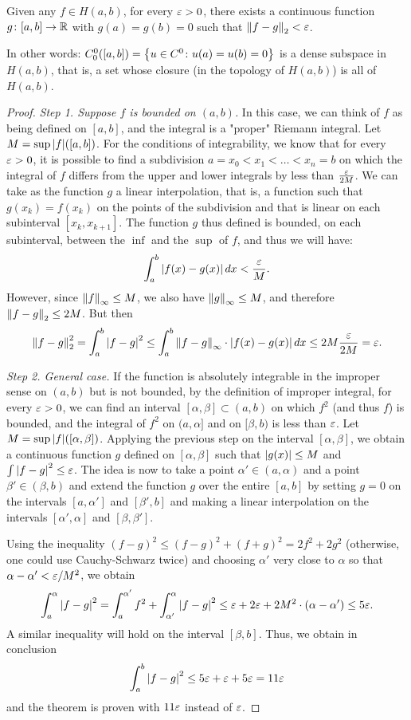 \begin{theorem}
Given any $f\in H(a, b)$, for every $\varepsilon>0$, there exists a continuous function
$g\colon [a,b]\to {\mathbb R}$ with $g(a)=g(b)=0$ such that ${\left\Vert f-g\right\Vert}_2<\varepsilon$.

In other words: $C^0_0([a,b])={\left\{ u\in C^0\colon u(a)=u(b)=0 \right\}}$ is a dense
subspace in $H(a,b)$, that is, a set whose closure (in the topology of $H(a,b)$)
is all of $H(a,b)$.
\end{theorem}
%
\begin{proof}
\emph{Step 1. Suppose $f$ is bounded on $(a,b)$.}
In this case, we can think of $f$ as being defined on $[a,b]$, and the integral
is a "proper" Riemann integral. Let $M=\sup {\left|f\right|}([a,b])$. For the conditions
of integrability, we know that for every $\varepsilon>0$, it is possible to find a
subdivision $a=x_0 < x_1 < \dots < x_n =b$ on which the integral of $f$ differs
from the upper and lower integrals by less than $\frac{\varepsilon}{2M}$. We can take
as the function $g$ a linear interpolation, that is, a function such that
$g(x_k) = f(x_k)$ on the points of the subdivision and that is linear on each
subinterval $[x_k,x_{k+1}]$. The function $g$ thus defined is bounded, on each
subinterval, between the $\inf$ and the $\sup$ of $f$, and thus we will have:
\[
 \int_a^b {\left|f(x)-g(x)\right|}\, dx < \frac{\varepsilon}{M}.
\]
However, since ${\left\Vert f\right\Vert}_\infty\le M$, we also have ${\left\Vert g\right\Vert}_\infty\le M$, and
therefore ${\left\Vert f-g\right\Vert}_2\le 2M$. But then
\[
  {\left\Vert f-g\right\Vert}_2^2 = \int_a^b {\left|f-g\right|}^2
  \le \int_a^b {\left\Vert f-g\right\Vert}_\infty \cdot {\left|f(x)-g(x)\right|}\, dx
  \le 2M \frac{\varepsilon}{2M} = \varepsilon.
\]

\emph{Step 2. General case.}
If the function is absolutely integrable in the improper sense on $(a,b)$ but is
not bounded, by the definition of improper integral, for every $\varepsilon>0$, we can
find an interval $[\alpha,\beta]\subset (a,b)$ on which $f^2$ (and thus $f$) is
bounded, and the integral of $f^2$ on $(a,\alpha]$ and on $[\beta,b)$ is less
than $\varepsilon$. Let $M=\sup {\left|f\right|}([\alpha,\beta])$. Applying the previous step on
the interval $[\alpha,\beta]$, we obtain a continuous function $g$ defined on
$[\alpha,\beta]$ such that ${\left|g(x)\right|}\le M$ and $\int{\left|f-g\right|}^2\le \varepsilon$. The
idea is now to take a point $\alpha'\in(a,\alpha)$ and a point
$\beta'\in(\beta,b)$ and extend the function $g$ over the entire $[a,b]$ by
setting $g=0$ on the intervals $[a,\alpha']$ and $[\beta',b]$ and making a
linear interpolation on the intervals $[\alpha',\alpha]$ and $[\beta,\beta']$.

Using the inequality $(f-g)^2 \le (f-g)^2+(f+g)^2 = 2f^2+2g^2$ (otherwise, one
could use Cauchy-Schwarz twice) and choosing $\alpha'$ very close to $\alpha$ so
that $\alpha-\alpha'<\varepsilon/M^2$, we obtain
\[
  \int_a^\alpha {\left|f-g\right|}^2 
  = \int_a^{\alpha'} f^2 + \int_{\alpha'}^\alpha {\left|f-g\right|}^2
  \le \varepsilon + 2\varepsilon + 2M^2\cdot(\alpha-\alpha')
  \le 5\varepsilon.
\]
A similar inequality will hold on the interval $[\beta,b]$. Thus, we obtain in
conclusion
\[
\int_a^b {\left|f-g\right|}^2
\le 5\varepsilon + \varepsilon + 5\varepsilon  = 11 \varepsilon
\]
and the theorem is proven with $11\varepsilon$ instead of $\varepsilon$.
\end{proof}

